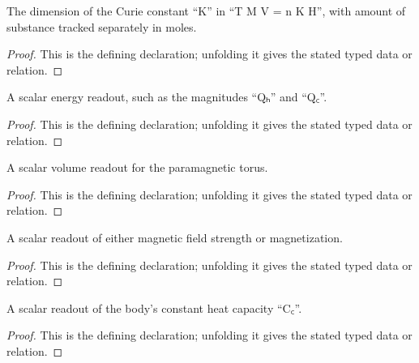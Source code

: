 \begin{definition}[molarCurieConstantDimension]
  \label{decl:physics:IPhO_2026_3_C_4:molarCurieConstantDimension}
  The dimension of the Curie constant “K” in “T M V = n K H”, with amount of substance tracked separately in moles.
\end{definition}
\begin{proof}
  This is the defining declaration; unfolding it gives the stated typed data or relation.
\end{proof}

\begin{definition}[EnergyReadout]
  \label{decl:physics:IPhO_2026_3_C_4:EnergyReadout}
  A scalar energy readout, such as the magnitudes “Qₕ” and “Q꜀”.
\end{definition}
\begin{proof}
  This is the defining declaration; unfolding it gives the stated typed data or relation.
\end{proof}

\begin{definition}[VolumeReadout]
  \label{decl:physics:IPhO_2026_3_C_4:VolumeReadout}
  A scalar volume readout for the paramagnetic torus.
\end{definition}
\begin{proof}
  This is the defining declaration; unfolding it gives the stated typed data or relation.
\end{proof}

\begin{definition}[MagneticIntensityReadout]
  \label{decl:physics:IPhO_2026_3_C_4:MagneticIntensityReadout}
  A scalar readout of either magnetic field strength or magnetization.
\end{definition}
\begin{proof}
  This is the defining declaration; unfolding it gives the stated typed data or relation.
\end{proof}

\begin{definition}[HeatCapacityReadout]
  \label{decl:physics:IPhO_2026_3_C_4:HeatCapacityReadout}
  A scalar readout of the body's constant heat capacity “C꜀”.
\end{definition}
\begin{proof}
  This is the defining declaration; unfolding it gives the stated typed data or relation.
\end{proof}


